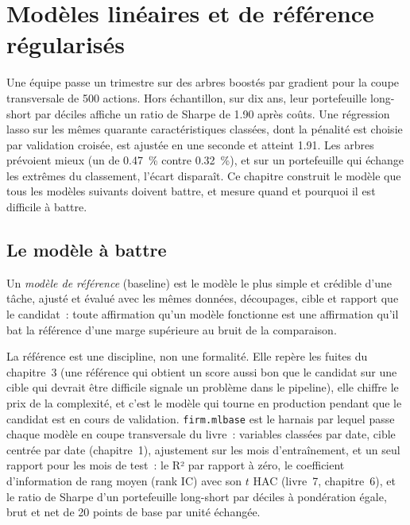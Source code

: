 \chapter{Modèles linéaires et de référence régularisés}\label{ch:ml:linear-and-regularised-baselines}

Une équipe passe un trimestre sur des arbres boostés par gradient pour la coupe transversale de 500 actions. Hors échantillon, sur dix ans,
leur portefeuille long-short par déciles affiche un ratio de Sharpe de 1.90 après coûts. Une régression lasso sur les mêmes quarante
caractéristiques classées, dont la pénalité est choisie par validation croisée, est ajustée en une seconde et atteint 1.91. Les arbres prévoient
mieux (un  de 0.47~\% contre 0.32~\%), et sur un portefeuille qui échange les extrêmes du
classement, l'écart disparaît. Ce chapitre construit le modèle que tous les modèles suivants doivent battre, et mesure quand et
pourquoi il est difficile à battre.

\section{Le modèle à battre}

\begin{definition}\label{def:ml:linear-and-regularised-baselines:baseline}
Un \emph{modèle de référence} (baseline) est le modèle le plus simple et crédible d'une tâche, ajusté et évalué avec les
mêmes données, découpages, cible et rapport que le candidat~: toute affirmation qu'un modèle fonctionne est une affirmation qu'il bat la
référence d'une marge supérieure au bruit de la comparaison.
\end{definition}

La référence est une discipline, non une formalité. Elle repère les fuites du chapitre~3 (une référence qui obtient un score aussi bon que le
candidat sur une cible qui devrait être difficile signale un problème dans le pipeline), elle chiffre le prix de la complexité, et c'est le modèle qui tourne
en production pendant que le candidat est en cours de validation. \texttt{firm.mlbase} est le harnais par lequel passe chaque modèle en coupe transversale du
livre~: variables classées par date, cible centrée par date (chapitre~1), ajustement sur les mois d'entraînement,
et un seul rapport pour les mois de test~: le R² par rapport à zéro, le coefficient d'information de rang moyen (rank IC) avec son $t$ HAC
(livre~7, chapitre~6), et le ratio de Sharpe d'un portefeuille long-short par déciles à pondération égale, brut et net de 20 points de base
par unité échangée.

